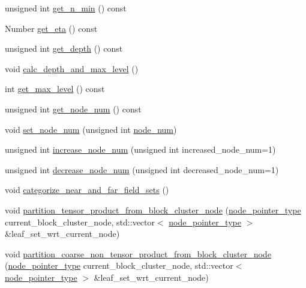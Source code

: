 \begin{DoxyCompactItemize}
\item 
unsigned int \hyperlink{classBlockClusterTree_ab00acda5e8fd4c3e381637d8d9322923}{get\+\_\+n\+\_\+min} () const
\item 
Number \hyperlink{classBlockClusterTree_a312d01ddb6cf5560d84abf7d254fa2c3}{get\+\_\+eta} () const
\item 
unsigned int \hyperlink{classBlockClusterTree_ab6c57acfcc5dfbbef04f028e6b9c749d}{get\+\_\+depth} () const
\item 
void \hyperlink{classBlockClusterTree_a7f9dbea25751771830c72d09efacacb2}{calc\+\_\+depth\+\_\+and\+\_\+max\+\_\+level} ()
\item 
int \hyperlink{classBlockClusterTree_a404693ef7dfdbc383705c38105c75e14}{get\+\_\+max\+\_\+level} () const
\item 
unsigned int \hyperlink{classBlockClusterTree_a042e040d2f6dfcbbfd70b43b8967c6f6}{get\+\_\+node\+\_\+num} () const
\item 
void \hyperlink{classBlockClusterTree_a02be4a882acca918386ad024769925bc}{set\+\_\+node\+\_\+num} (unsigned int \hyperlink{classBlockClusterTree_a75757146cea0aa0e9271b760b1d76307}{node\+\_\+num})
\item 
unsigned int \hyperlink{classBlockClusterTree_aec9920e5b215fbfe2aa9f54980d3b30a}{increase\+\_\+node\+\_\+num} (unsigned int increased\+\_\+node\+\_\+num=1)
\item 
unsigned int \hyperlink{classBlockClusterTree_ae0e55e3ac56bffa31f251d4f07ae7e51}{decrease\+\_\+node\+\_\+num} (unsigned int decreased\+\_\+node\+\_\+num=1)
\item 
void \hyperlink{classBlockClusterTree_a286bd48cc863cbba7c9ad53b6bdb12ca}{categorize\+\_\+near\+\_\+and\+\_\+far\+\_\+field\+\_\+sets} ()
\item 
void \hyperlink{classBlockClusterTree_ae77f8167ce49871f5751b8dcf8c93153}{partition\+\_\+tensor\+\_\+product\+\_\+from\+\_\+block\+\_\+cluster\+\_\+node} (\hyperlink{classTreeNode}{node\+\_\+pointer\+\_\+type} current\+\_\+block\+\_\+cluster\+\_\+node, std\+::vector$<$ \hyperlink{classTreeNode}{node\+\_\+pointer\+\_\+type} $>$ \&leaf\+\_\+set\+\_\+wrt\+\_\+current\+\_\+node)
\item 
void \hyperlink{classBlockClusterTree_a61b6c204f3f1d5ff7c71a07b26ca9d09}{partition\+\_\+coarse\+\_\+non\+\_\+tensor\+\_\+product\+\_\+from\+\_\+block\+\_\+cluster\+\_\+node} (\hyperlink{classTreeNode}{node\+\_\+pointer\+\_\+type} current\+\_\+block\+\_\+cluster\+\_\+node, std\+::vector$<$ \hyperlink{classTreeNode}{node\+\_\+pointer\+\_\+type} $>$ \&leaf\+\_\+set\+\_\+wrt\+\_\+current\+\_\+node)

\end{DoxyCompactItemize}
